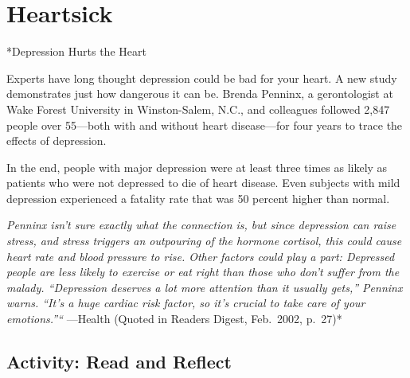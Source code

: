 \documentclass[
]{book}
\begin{document}
\hypertarget{heartsick}{%
\section{Heartsick}\label{heartsick}}

*Depression Hurts the Heart

Experts have long thought depression could be bad for your heart. A new study demonstrates just how dangerous it can be. Brenda Penninx, a gerontologist at Wake Forest University in Winston-Salem, N.C., and colleagues followed 2,847 people over 55---both with and without heart disease---for four years to trace the effects of depression.

In the end, people with major depression were at least three times as likely as patients who were not depressed to die of heart disease. Even subjects with mild depression experienced a fatality rate that was 50 percent higher than normal.

\emph{Penninx isn't sure exactly what the connection is, but since depression can raise stress, and stress triggers an outpouring of the hormone cortisol, this could cause heart rate and blood pressure to rise. Other factors could play a part: Depressed people are less likely to exercise or eat right than those who don't suffer from the malady. ``Depression deserves a lot more attention than it usually gets,'' Penninx warns. ``It's a huge cardiac risk factor, so it's crucial to take care of your emotions.''``} ---Health (Quoted in Readers Digest, Feb.~2002, p.~27)*

\hypertarget{activity-read-and-reflect-16}{%
\subsection*{Activity: Read and Reflect}\label{activity-read-and-reflect-16}}
\end{document}
